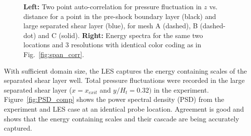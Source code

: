 \documentclass[]{aiaa-tc}%
\begin{document}





\begin{figure}[!ht]
	\centering
	\caption{ {\bf Left:} Two point auto-correlation for pressure fluctuation in $z$ vs. distance for a point in the pre-shock boundary layer (black) and large separated shear layer (blue), for mesh A (dashed), B (dashed-dot) and C (solid).  
	{\bf Right:} Energy spectra for the same two locations and 3 resolutions with identical color coding as in Fig.~\ref{fig:span_corr}.
 	}
\end{figure}



With sufficient domain size, the LES captures the energy containing scales of the separated shear layer well.  Total pressure fluctuations were recorded in the large separated shear layer ($x=x_{exit}$ and $y/H_t = 0.32)$ in the experiment.  Figure~\ref{fig:PSD_comp} shows the power spectral density (PSD) from the experiment and LES case at an identical probe location.  Agreement is good and shows that the energy containing scales and their cascade are being accurately captured.  
\end{document}
